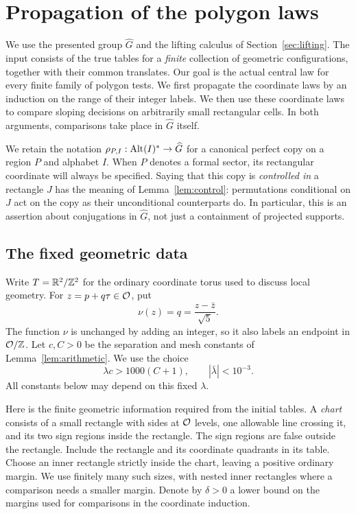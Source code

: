 \section{Propagation of the polygon laws}\label{sec:propagation}

We use the presented group $\widehat G$ and the lifting calculus of
Section~\ref{sec:lifting}.  The input consists of the true tables for a
\emph{finite} collection of geometric configurations, together with their
common translates.  Our goal is the actual central law for every finite
family of polygon tests.  We first propagate the coordinate laws by an
induction on the range of their integer labels.  We then use these
coordinate laws to compare sloping decisions on arbitrarily small
rectangular cells.  In both arguments, comparisons take place in
$\widehat G$ itself.

We retain the notation $\rho_{P,I}:\operatorname{Alt}(I)^\ast\to\widehat G$ for a
canonical perfect copy on a region $P$ and alphabet $I$.  When $P$ denotes
a formal sector, its rectangular coordinate will always be specified.
Saying that this copy is \emph{controlled in} a rectangle $J$ has the
meaning of Lemma~\ref{lem:control}: permutations conditional on $J$ act on
the copy as their unconditional counterparts do.  In particular, this is
an assertion about conjugations in $\widehat G$, not just a containment
of projected supports.

\subsection{The fixed geometric data}

Write $T=\mathbb R^2/\mathbb Z^2$ for the ordinary coordinate torus used to discuss
local geometry.  For $z=p+q\tau\in\mathcal O$, put
\[
 \nu(z)=q=\frac{z-\bar z}{\sqrt5}.
\]
The function $\nu$ is unchanged by adding an integer, so it also labels
an endpoint in $\mathcal O/\mathbb Z$.  Let $c,C>0$ be the separation and mesh
constants of Lemma~\ref{lem:arithmetic}.  We use the choice
\begin{equation}\label{eq:prop-slope-choice}
 \lambda c>1000(C+1),\qquad |\bar\lambda|<10^{-3}.
\end{equation}
All constants below may depend on this fixed $\lambda$.

Here is the finite geometric information required from the initial
tables.  A \emph{chart} consists of a small rectangle with sides at
$\mathcal O$ levels, one allowable line crossing it, and its two sign regions
inside the rectangle.  The sign regions are false outside the rectangle.
Include the rectangle and its coordinate quadrants in its table.  Choose
an inner rectangle strictly inside the chart, leaving a positive
ordinary margin.  We use finitely many such sizes, with nested inner
rectangles where a comparison needs a smaller margin.  Denote by
$\delta>0$ a lower bound on the margins used for comparisons in the
coordinate induction.

